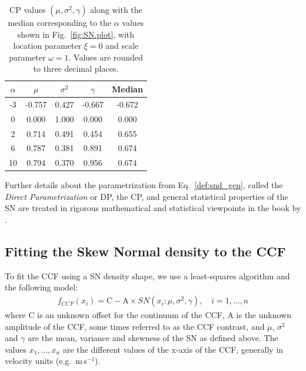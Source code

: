 \documentclass{aa}
\def\ms{\hbox{\,m\,s$^{-1}$}}         %
\begin{document}
\begin{table}[htbp]
\begin{center}
   \caption{CP values $(\mu, \sigma^2, \gamma)$ along with the median corresponding to the $\alpha$ values shown in Fig.~\ref{fig:SN.plot}, with location parameter $\xi = 0$ and scale parameter $\omega = 1$. Values are rounded to three decimal places.}
   \label{tab:cp_values}
   \begin{tabular}{|ccccc|} %
\hline
$\alpha$ & $\mu$ & $\sigma^2$ & $\gamma$  & Median \\
\hline
 -3 	&	 -0.757	&	 0.427	&	 -0.667  	& 	-0.672\\
0	&	 0.000 	&	1.000	&	 0.000 	& 	0.000\\
2	&	 0.714	&	 0.491	&	 0.454 	& 	0.655\\
6	&	 0.787	&	 0.381	&	 0.891 	& 	0.674\\
10	&	 0.794	&	 0.370	&	 0.956 	& 	0.674\\
\hline
   \end{tabular}

\end{center}
\end{table}
%
Further details about the parametrization from Eq.~\ref{def:snd_gen}, called the \emph{Direct Parametrization} or DP, the CP, and general statistical properties of the SN are treated in rigorous mathematical and statistical viewpoints in the book by \cite{Azzalini2014}.

\subsection{Fitting the Skew Normal density to the CCF} \label{sec:3}

To fit the CCF using a SN density shape, we use a least-squares algorithm and the following model:
%
\begin{eqnarray} \label{eq:3}
f_{CCF}(x_i) = \mathrm{C} - \mathrm{A} \times SN(x_i;\mu, \sigma^2, \gamma), \quad i = 1, \ldots, n
\end{eqnarray}
%
where C is an unknown offset for the continuum of the CCF, A is the unknown amplitude of the CCF, some times referred to as the CCF contrast, and $\mu$, $\sigma^2$ and $\gamma$ are the mean, variance and skewness of the SN as defined above.
The values $x_1, \ldots, x_n$ are the different values of the x-axis of the CCF, generally in velocity units (e.g. \ms).
\end{document}
